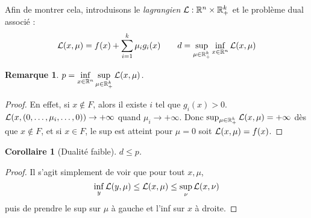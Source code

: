 \documentclass[a4paper, 11pt]{article}
\def\R{\mathbb{R}}
\def\L{{\cal{L}}}
\newtheorem*{remark}{Remarque}
\newtheorem*{corollary}{Corollaire}
\begin{document}
Afin de montrer cela, introduisons le \emph{lagrangien} $\L : \R^n \times
\R_+^k$ et le problème dual associé :
\[ \L(x, \mu) = f(x) + \sum_{i=1}^k \mu_i g_i(x) \qquad
  d = \sup_{\mu \in \R_+^k} \inf_{x \in \R^n} \L(x,\mu) \]

\begin{remark} $\displaystyle p = \inf_{x \in \R^n} \sup_{\mu \in \R_+^k}
  \L(x,\mu)$.
\end{remark}
\begin{proof}
  En effet, si $x \not\in F$, alors il existe $i$ tel que $g_i(x) > 0$.
  $\L(x,(0, \ldots, \mu_i, \ldots, 0)) \to +\infty$ quand $\mu_i \to
  +\infty$. Donc $\sup_{\mu \in \R_+^k} \L(x,\mu) = +\infty$ dès que $x \not\in
  F$, et si $x \in F$, le sup est atteint pour $\mu = 0$ soit $\L(x,\mu) =
  f(x)$.
\end{proof}
\begin{corollary}[Dualité faible]
  $d \leq p$.
\end{corollary}
\begin{proof}
  Il s'agit simplement de voir que pour tout $x, \mu$,
  \[ \inf_{y} \L(y, \mu) \leq \L(x,\mu) \leq \sup_{\nu} \L(x,\nu) \]
  puis de prendre le sup sur $\mu$ à gauche et l'inf sur $x$ à droite.
\end{proof}
\end{document}
